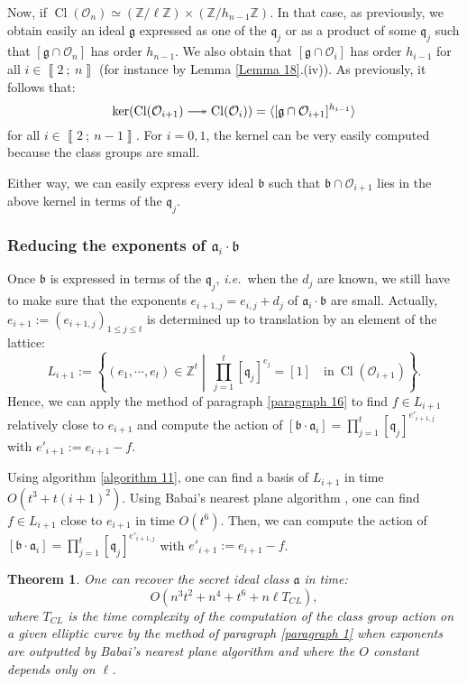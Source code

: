 \documentclass[a4paper,10pt]{report}
\theoremstyle{definition}
\theoremstyle{plain}
\newtheorem{Theorem}[Definition]{Theorem}
\theoremstyle{definition}
\newcommand{\ie}{\emph{i.e.}\ }
\newcommand{\Z}{\mathbb{Z}}
\newcommand{\mO}{\mathcal{O}}
\renewcommand{\i}[2]{\left\llbracket #1~;~#2\right\rrbracket}
\renewcommand{\(}{\left(}
\renewcommand{\)}{\right)}
\newcommand{\mf}[1]{\mathfrak{#1}}
\DeclareMathOperator{\Cl}{Cl}
\begin{document}
Now, if $\Cl(\mO_n)\simeq(\Z/\ell\Z)\times(\Z/h_{n-1}\Z)$.  In that case, as previously, we obtain easily an ideal $\mf{g}$ expressed as one of the $\mf{q}_j$ or as a product of some $\mf{q}_j$ such that $[\mf{g}\cap\mO_n]$ has order $h_{n-1}$. We also obtain that $[\mf{g}\cap\mO_i]$ has order $h_{i-1}$ for all $i\in\i{2}{n}$ (for instance by Lemma \ref{Lemma 18}.(iv)).  As previously, it follows that:
\[\ker(\Cl(\mO_{i+1})\relbar\joinrel\twoheadrightarrow\Cl(\mO_{i}))=\langle [\mf{g}\cap\mO_{i+1}]^{h_{i-1}}\rangle\]
for all $i\in\i{2}{n-1}$. For $i=0,1$, the kernel can be very easily computed because the class groups are small. 

Either way, we can easily express every ideal $\mf{b}$ such that $\mf{b}\cap\mO_{i+1}$ lies in the above kernel in terms of the $\mf{q}_j$.

\subsubsection{Reducing the exponents of $\mf{a}_i\cdot \mf{b}$}

Once $\mf{b}$ is expressed in terms of the $\mf{q}_j$, \ie when the $d_j$ are known, we still have to make sure that the exponents $e_{i+1,j}=e_{i,j}+d_j$ of $\mf{a}_i\cdot \mf{b}$ are small.  Actually, $e_{i+1}:=(e_{i+1,j})_{1\leq j\leq t}$ is determined up to translation by an element of the lattice:
\[L_{i+1}:=\left\{(e_1,\cdots,e_{t})\in\Z^{t} \middle| \  \prod_{j=1}^t[\mf{q}_j]^{e_j}=[1] \quad \mbox{in} \ \Cl(\mO_{i+1}) \right\}.\]
Hence, we can apply the method of paragraph \ref{paragraph 16} to find $f\in L_{i+1}$ relatively close to $e_{i+1}$ and compute the action of $[\mf{b}\cdot\mf{a}_i]=\prod_{j=1}^t[\mf{q}_j]^{e'_{i+1,j}}$ with $e'_{i+1}:=e_{i+1}-f$.  

Using algorithm \ref{algorithm 11},  one can find a basis of $L_{i+1}$ in time $O(t^3+t(i+1)^2)$. Using Babai's nearest plane algorithm \cite{Babai}, one can find $f\in L_{i+1}$ close to $e_{i+1}$ in time $O(t^6)$. Then, we can compute the action of $[\mf{b}\cdot\mf{a}_i]=\prod_{j=1}^t[\mf{q}_j]^{e'_{i+1,j}}$ with $e'_{i+1}:=e_{i+1}-f$.  

\begin{Theorem}
One can recover the secret ideal class $\mf{a}$ in time:
\[O\(n^3t^2+n^4+t^6+n\ell T_{CL}\),\]
where $T_{CL}$ is the time complexity of the computation of the class group action on a given elliptic curve by the method of paragraph \ref{paragraph 1} when exponents are outputted by Babai's nearest plane algorithm and where the $O$ constant depends only on $\ell$.
\end{Theorem}
\end{document}

